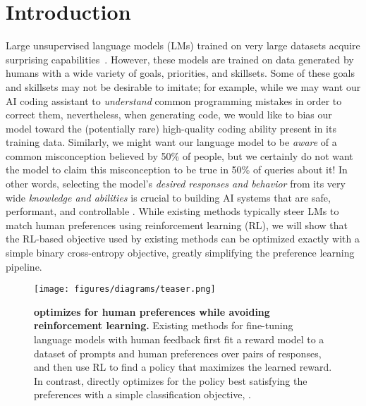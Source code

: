 \section{Introduction}
Large unsupervised language models (LMs) trained on very large datasets
acquire surprising capabilities~\citep{chowdhery2022palm, brown2020language, touvron2023llama,bubeck2023sparks}. However, these models are trained on data generated by humans with a wide variety of goals, priorities, and skillsets. Some of these goals and skillsets may not be desirable to imitate; for example, while we may want our AI coding assistant to \textit{understand} common programming mistakes in order to correct them, nevertheless, when generating code, we would like to bias our model toward the (potentially rare) high-quality coding ability present in its training data. Similarly, we might want our language model to be \textit{aware} of a common misconception believed by 50\% of people, but we certainly do not want the model to claim this misconception to be true in 50\% of queries about it! In other words, selecting the model's \emph{desired responses and behavior} from its very wide \textit{knowledge and abilities} is crucial to building AI systems that are safe, performant, and controllable \citep{ouyang2022training}. While existing methods typically steer LMs to match human preferences using reinforcement learning (RL), we will show that the RL-based objective used by existing methods can be optimized exactly with a simple binary cross-entropy objective, greatly simplifying the preference learning pipeline.

\begin{figure}
    \centering
    \texttt{[image: figures/diagrams/teaser.png]}
    \caption{\textbf{{\methodac} optimizes for human preferences while avoiding reinforcement learning.} Existing methods for fine-tuning language models with human feedback first fit a reward model to a dataset of prompts and human preferences over pairs of responses, and then use RL to find a policy that maximizes the learned reward. In contrast, {\methodac} directly optimizes for the policy best satisfying the preferences with a simple classification objective, .}
    \vspace{-2mm}
    \label{fig:teaser}
\end{figure}


